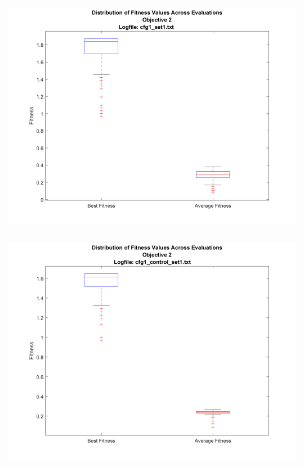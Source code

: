 \documentclass[11pt]{article}
\begin{document}
\begin{figure}[H]
\begin{minipage}{.5\textwidth}
  \includegraphics[width=3in]{assn1d_boxplot_cfg1_set1_obj2.png}
  \label{fig:boxplot_control_obj2}
\end{minipage}%
\begin{minipage}{.5\textwidth}
  \includegraphics[width=3in]{assn1d_boxplot_cfg1_control_set1_obj2.png}
  \label{fig:boxplot_expl_obj2}
\end{minipage}
\end{figure}
\end{document}
